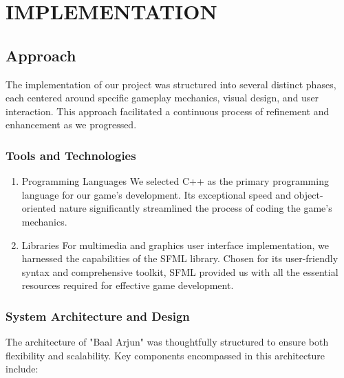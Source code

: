 \section{IMPLEMENTATION}


	 \subsection{Approach}
	
		The implementation of our project was structured into several distinct phases, each centered around specific gameplay mechanics, visual design, and user interaction. This approach facilitated a continuous process of refinement and enhancement as we progressed.
	
	 \subsubsection{Tools and Technologies}
		\begin{enumerate}
			\item Programming Languages
					We selected C++ as the primary programming language for our game's development. Its exceptional speed and object-oriented nature significantly streamlined the process of coding the game's mechanics.
			\item Libraries
					For multimedia and graphics user interface implementation, we harnessed the capabilities of the SFML library. Chosen for its user-friendly syntax and comprehensive toolkit, SFML provided us with all the essential resources required for effective game development.
			
		\end{enumerate}
	
	\subsubsection{System Architecture and Design}
	
		The architecture of "Baal Arjun" was thoughtfully structured to ensure both flexibility and scalability. Key components encompassed in this architecture include:
		

